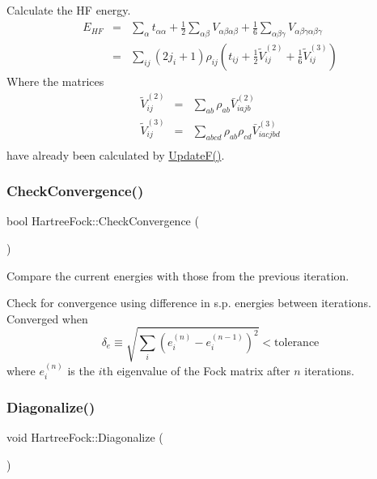 Calculate the HF energy. \begin{eqnarray*} E_{HF} &=& \sum_{\alpha} t_{\alpha\alpha} + \frac{1}{2}\sum_{\alpha\beta} V_{\alpha\beta\alpha\beta} + \frac{1}{6}\sum_{\alpha\beta\gamma} V_{\alpha\beta\gamma\alpha\beta\gamma} \\ &=& \sum_{ij} (2j_i+1) \rho_{ij} ( t_{ij} +\frac{1}{2}\tilde{V}^{(2)}_{ij} + \frac{1}{6}\tilde{V}^{(3)}_{ij} ) \end{eqnarray*} Where the matrices \begin{eqnarray*} \tilde{V}^{(2)}_{ij} &=& \sum_{ab} \rho_{ab}\bar{V}^{(2)}_{iajb} \\ \tilde{V}^{(3)}_{ij} &=& \sum_{abcd} \rho_{ab}\rho_{cd} \bar{V}^{(3)}_{iacjbd} \\ \end{eqnarray*} have already been calculated by \hyperlink{classHartreeFock_a84fe0eb16f6e5835c920bf8fa98c4442}{Update\+F()}. \mbox{\label{classHartreeFock_a35ab9c4f96e68b1c9acea1d1407ecc60}} 
\subsubsection{\texorpdfstring{Check\+Convergence()}{CheckConvergence()}}
{\footnotesize\ttfamily bool Hartree\+Fock\+::\+Check\+Convergence (\begin{DoxyParamCaption}{ }\end{DoxyParamCaption})}



Compare the current energies with those from the previous iteration. 

Check for convergence using difference in s.\+p. energies between iterations. Converged when \[ \delta_{e} \equiv \sqrt{ \sum_{i}(e_{i}^{(n)}-e_{i}^{(n-1)})^2} < \textrm{tolerance} \] where $ e_{i}^{(n)} $ is the $ i $th eigenvalue of the Fock matrix after $ n $ iterations. \mbox{\label{classHartreeFock_a00f7b0c4cb7373a3f1a69ca27a4dfaed}} 
\subsubsection{\texorpdfstring{Diagonalize()}{Diagonalize()}}
{\footnotesize\ttfamily void Hartree\+Fock\+::\+Diagonalize (\begin{DoxyParamCaption}{ }\end{DoxyParamCaption})}



